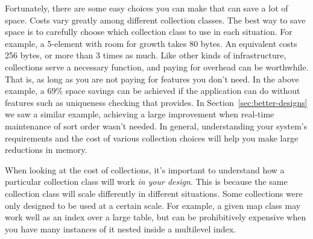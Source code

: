 



Fortunately, there are some
easy choices you can make that can save a lot of space. Costs vary greatly among
different collection classes. The best way to save space is to carefully choose
which collection class to use in each situation.
For example, a 5-element  with room for growth takes 80 bytes. 
An equivalent  costs 256 bytes,
or more than 3 times as much. Like other kinds of infrastructure, collections
serve a necessary function, and paying for overhead can be worthwhile. That is, as long as you are not
paying for features you don't need. In the above example, a
69\% space savings can be achieved if the application can do without features
such as uniqueness checking that
 provides. In Section~\ref{sec:better-designs} we saw a similar
example, achieving a large improvement when real-time
maintenance of sort order wasn't needed. In general, understanding your system's
requirements and the cost of various collection choices will help you make large
reductions in memory.

When looking at the cost of collections, it's important to understand how a
particular collection class will work \emph{in your design}. This is because the
same collection class will scale differently in different situations. Some collections
were only designed to be used at a certain scale.
For example, a given map class may work
well as an index over a large table, but can be prohibitively expensive when you
have many instances of it nested inside a multilevel index. 


